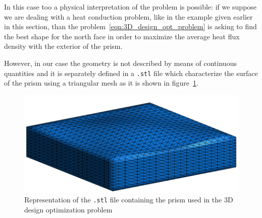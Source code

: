 In this case too a physical interpretation of the problem is possible: if we suppose we are dealing with a heat conduction problem, like in the example given earlier in this section, than the problem~\eqref{eqn:3D_design_opt_problem} is asking to find the best shape for the north face in order to maximize the average heat flux density with the exterior of the prism.

\medskip
However, in our case the geometry is not described by means of continuous quantities and it is separately defined in a \verb|.stl| file which characterize the surface of the prism using a triangular mesh as it is shown in figure~\ref{fig:3D_cube_stl_initial}.

\begin{figure}
	\centering
	\includegraphics[width=.5\textwidth]{img/3D_cube_as_stl_cropped_1}
	\caption{Representation of the \texttt{.stl} file containing the prism used in the $3$D design optimization problem}
	\label{fig:3D_cube_stl_initial}
\end{figure}

